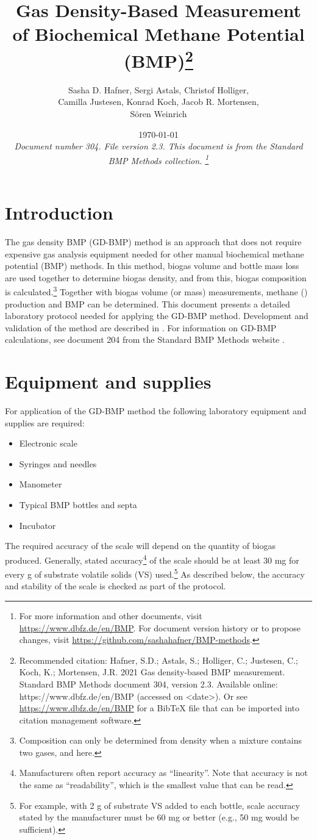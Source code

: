 \documentclass[]{article}
\title {Gas Density-Based Measurement of Biochemical Methane Potential (BMP)\footnote{
  Recommended citation: 
Hafner, S.D.; Astals, S.; Holliger, C.; Justesen, C.; Koch, K.; Mortensen, J.R. 2021 Gas density-based BMP measurement. Standard BMP Methods document 304, version 2.3. Available online: https://www.dbfz.de/en/BMP (accessed on <date>).
\newline
  Or see \url{https://www.dbfz.de/en/BMP} for a BibTeX file that can be imported into citation management software.
}
}
\author{Sasha D. Hafner, Sergi Astals, Christof Holliger, \\ Camilla Justesen, Konrad Koch, Jacob R. Mortensen, \\ S\"oren Weinrich}
\date{\today \\
\bigskip
\textit{
  Document number 304.
  File version 2.3. 
  This document is from the Standard BMP Methods collection.
    \footnote{For more information and other documents, visit \url{https://www.dbfz.de/en/BMP}. 
    For document version history or to propose changes, visit \url{https://github.com/sashahafner/BMP-methods}.}
}
}
\begin{document}
\maketitle

\section{Introduction}
The gas density BMP (GD-BMP) method is an approach that does not require expensive gas analysis equipment needed for other manual biochemical methane potential (BMP) methods.
In this method, biogas volume and bottle mass loss are used together to determine biogas density, and from this, biogas composition is calculated.\footnote{Composition can only be determined from density when a mixture contains two gases,  and  here.}
Together with biogas volume (or mass) measurements, methane () production and BMP can be determined.
This document presents a detailed laboratory protocol needed for applying the GD-BMP method.
Development and validation of the method are described in \citet{justesenDevelopmentValidationLowcost2019}.
For information on GD-BMP calculations, see document 204 from the Standard BMP Methods website \citep{BMPdoc204gasdens}. 

\section{Equipment and supplies}
\label{sec:equipment}
For application of the GD-BMP method the following laboratory equipment and supplies are required:
\begin{itemize}
    \item Electronic scale
    \item Syringes and needles
    \item Manometer
    \item Typical BMP bottles and septa
    \item Incubator
\end{itemize}

The required accuracy of the scale will depend on the quantity of biogas produced. 
Generally, stated accuracy\footnote{
  Manufacturers often report accuracy as ``linearity''. 
  Note that accuracy is not the same as ``readability'', which is the smallest value that can be read. 
} of the scale should be at least 30 mg for every g of substrate volatile solids (VS) used.\footnote{
  For example, with 2 g of substrate VS added to each bottle, scale accuracy stated by the manufacturer must be 60 mg or better (e.g., 50 mg would be sufficient).
}
As described below, the accuracy and stability of the scale is checked as part of the protocol.
\end{document}
